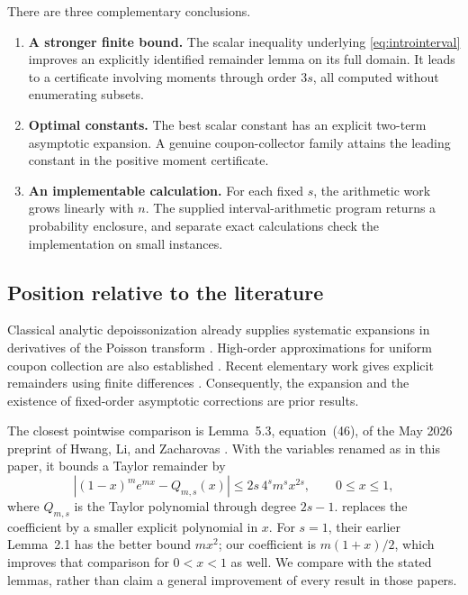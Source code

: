 \documentclass[11pt,a4paper]{article}
\theoremstyle{definition}
\begin{document}
There are three complementary conclusions.
\begin{enumerate}
\item \textbf{A stronger finite bound.} The scalar inequality underlying
\eqref{eq:introinterval} improves an explicitly identified remainder lemma
on its full domain. It leads to a certificate involving moments through
order $3s$, all computed without enumerating subsets.
\item \textbf{Optimal constants.} The best scalar constant has an explicit
two-term asymptotic expansion. A genuine coupon-collector family attains
the leading constant in the positive moment certificate.
\item \textbf{An implementable calculation.} For each fixed $s$, the
arithmetic work grows linearly with $n$. The supplied interval-arithmetic
program returns a probability enclosure, and separate exact calculations
check the implementation on small instances.
\end{enumerate}

\subsection{Position relative to the literature}\label{sec:position}

Classical analytic depoissonization already supplies systematic expansions
in derivatives of the Poisson transform \cite{JacquetSz1998}. High-order
approximations for uniform coupon collection are also established
\cite{Posfai2010}. Recent elementary work gives explicit remainders using
finite differences \cite{Zacharovasv2}. Consequently, the expansion and
the existence of fixed-order asymptotic corrections are prior results.

The closest pointwise comparison is Lemma~5.3, equation~(46), of the May
2026 preprint of Hwang, Li, and Zacharovas \cite{HLZ2026}. With the
variables renamed as in this paper, it bounds a Taylor remainder by
\begin{equation}\label{eq:HLZ}
 \left|(1-x)^m e^{mx}-Q_{m,s}(x)\right|
 \le 2s\,4^s m^s x^{2s},\qquad 0\le x\le1,
\end{equation}
where $Q_{m,s}$ is the Taylor polynomial through degree $2s-1$.
 replaces the coefficient by a smaller explicit polynomial
in $x$. For $s=1$, their earlier Lemma~2.1 has the better bound $mx^2$;
our coefficient is $m(1+x)/2$, which improves that comparison for
$0<x<1$ as well. We compare with the stated lemmas, rather than claim a
general improvement of every result in those papers.
\end{document}
